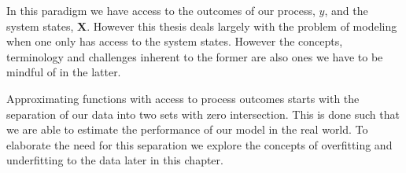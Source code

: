 In this paradigm we have access to the outcomes of our process, $\hat{y}$, and the system states, $\mathbf{X}$. However this thesis deals largely with the problem of modeling when one only has access to the system states.  However the concepts, terminology and challenges inherent to the former are also ones we have to be mindful of in the latter.

Approximating functions with access to process outcomes starts with the separation of our data into two sets with zero intersection. This is done such that we are able to estimate the performance of our model in the real world. To elaborate the need for this separation we explore the concepts of overfitting and underfitting to the data later in this chapter.